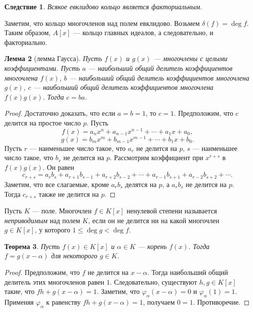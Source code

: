 \documentclass[12pt, titlepage, oneside]{amsbook}
\newtheorem{theorem}{Теорема}[chapter]
\newtheorem{lemma}[theorem]{Лемма}
\newtheorem{corollary}[theorem]{Следствие}
\theoremstyle{definition}
\theoremstyle{remark}
\begin{document}
\begin{corollary}
	\label{Mnog7}
	Всякое евклидово кольцо является факториальным.
\end{corollary}

Заметим, что кольцо многочленов над полем евклидово. Возьмем $\delta(f)=\deg f$. Таким образом, $A[x]$ --- кольцо главных идеалов, а следовательно, и факториально.

\begin{lemma}[лемма Гаусса]
	\label{Gaus}
	Пусть $f(x)$ и $g(x)$ --- многочлены с целыми коэффициентами. Пусть $a$ --- наибольший общий делитель коэффициентов многочлена $f(x)$, $b$ --- наибольший общий делитель коэффициентов многочлена $g(x)$, $c$ --- наибольший общий делитель коэффициентов многочлена $f(x)g(x)$. Тогда $c=ba$.
\end{lemma}

\begin{proof}
	Достаточно доказать, что если $a=b=1$, то $c=1$. Предположим, что $c$ делится на простое число $p$. Пусть $$f(x)=a_n x^n+ a_{n-1}x^{n-1}+\cdots+a_1 x+ a_0,$$ $$g(x)=b_m x^m+ b_{m-1}x^{m-1}+\cdots+b_1 x+ b_0.$$ Пусть $r$ --- наименьшее число такое, что $a_r$ не делится на $p$, $s$ --- наименьшее число такое, что $b_s$ не делится на $p$. Рассмотрим коэффициент при $x^{r+s}$ в $f(x)g(x)$. Он равен $$c_{r+s}=a_rb_s+a_{r+1}b_{s-1}+a_{r+2}b_{s-2}+\cdots+a_{r-1}b_{s+1}+a_{r-2}b_{s+2}+\cdots.$$ Заметим, что все слагаемые, кроме $a_rb_s$ делятся на $p$, а $a_rb_s$ не делится на $p$. Тогда $c_{r+s}$ также не делится на $p$.
\end{proof}

Пусть $K$ --- поле. Многочлен $f\in K[x]$ ненулевой степени называется \emph{неприводимым} над полем $K$, если он не делится ни на какой многочлен $g\in K[x]$, у которого $1\leq\deg g<\deg f$.

\begin{theorem}
	\label{Mnog8} Пусть $f(x)\in K[x]$ и $\alpha\in K$ --- корень $f(x)$. Тогда $f=g(x-\alpha)$ для некоторого $g\in K$.
\end{theorem}

\begin{proof}
	Предположим, что $f$ не делится на $x-\alpha$. Тогда наибольший общий делитель этих многочленов равен $1$. Следовательно, существуют $h,g\in K[x]$ такие, что $fh+g(x-\alpha)=1$. Заметим, что $\varphi_{\alpha}(x-\alpha)=0$ и $\varphi_{\alpha}(1)=1$. Применяя $\varphi_{\alpha}$ к равенству $fh+g(x-\alpha)=1$, получаем $0=1$. Противоречие.
\end{proof}
\end{document}
